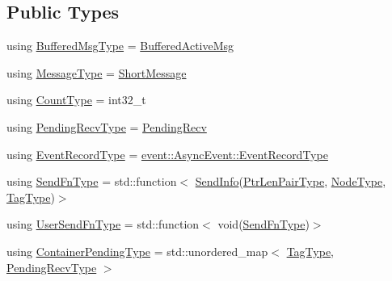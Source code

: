 \subsection*{Public Types}
\begin{DoxyCompactItemize}
\item 
using \hyperlink{structvt_1_1messaging_1_1_active_messenger_a80a9cbda399d7bf035bfcecc761f4b02}{Buffered\+Msg\+Type} = \hyperlink{structvt_1_1messaging_1_1_buffered_active_msg}{Buffered\+Active\+Msg}
\item 
using \hyperlink{structvt_1_1messaging_1_1_active_messenger_a720a2b1e7462d414b2a51d9fe005eca9}{Message\+Type} = \hyperlink{namespacevt_a1125ac1da6c0bbf141e0ea0739d7602d}{Short\+Message}
\item 
using \hyperlink{structvt_1_1messaging_1_1_active_messenger_aa69cbede6a9fbc4d727bfb38d5546600}{Count\+Type} = int32\+\_\+t
\item 
using \hyperlink{structvt_1_1messaging_1_1_active_messenger_add1d7ab7bf168d53dfe7b93f29f64f02}{Pending\+Recv\+Type} = \hyperlink{structvt_1_1messaging_1_1_pending_recv}{Pending\+Recv}
\item 
using \hyperlink{structvt_1_1messaging_1_1_active_messenger_aed736a2b2eaa0f96971a4f0be3fe0a25}{Event\+Record\+Type} = \hyperlink{structvt_1_1event_1_1_async_event_a5b4ef37db6e5962fdc0e6e0e56e74bc1}{event\+::\+Async\+Event\+::\+Event\+Record\+Type}
\item 
using \hyperlink{structvt_1_1messaging_1_1_active_messenger_a09efd64a8c1bc26a7333c70b76ca01bd}{Send\+Fn\+Type} = std\+::function$<$ \hyperlink{structvt_1_1messaging_1_1_send_info}{Send\+Info}(\hyperlink{namespacevt_a97f320a1d3b9b4035e591671cd7d10f0}{Ptr\+Len\+Pair\+Type}, \hyperlink{namespacevt_a866da9d0efc19c0a1ce79e9e492f47e2}{Node\+Type}, \hyperlink{namespacevt_a84ab281dae04a52a4b243d6bf62d0e52}{Tag\+Type})$>$
\item 
using \hyperlink{structvt_1_1messaging_1_1_active_messenger_a4b1993ad77436b6ed6c7fd32801c50ed}{User\+Send\+Fn\+Type} = std\+::function$<$ void(\hyperlink{structvt_1_1messaging_1_1_active_messenger_a09efd64a8c1bc26a7333c70b76ca01bd}{Send\+Fn\+Type})$>$
\item 
using \hyperlink{structvt_1_1messaging_1_1_active_messenger_a388e97eeb72592e57551e045b43bcfde}{Container\+Pending\+Type} = std\+::unordered\+\_\+map$<$ \hyperlink{namespacevt_a84ab281dae04a52a4b243d6bf62d0e52}{Tag\+Type}, \hyperlink{structvt_1_1messaging_1_1_active_messenger_add1d7ab7bf168d53dfe7b93f29f64f02}{Pending\+Recv\+Type} $>$
\item 

\end{DoxyCompactItemize}
